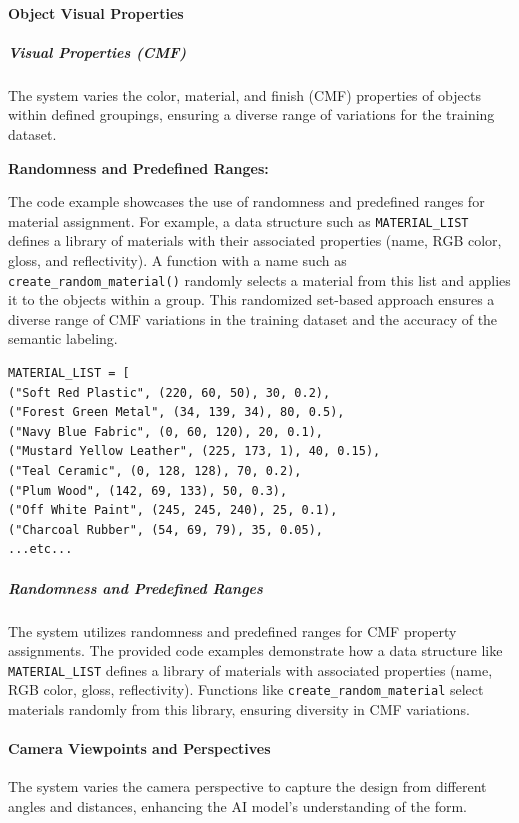 \documentclass[12pt]{article}
\begin{document}
\paragraph{Object Visual Properties}

\subparagraph{Visual Properties (CMF)}
The system varies the color, material, and finish (CMF) properties of objects within defined groupings, ensuring a diverse range of variations for the training dataset.

\textbf{Randomness and Predefined Ranges:}

The code example showcases the use of randomness and predefined ranges for material assignment. For example, a data structure such as \texttt{MATERIAL\_LIST} defines a library of materials with their associated properties (name, RGB color, gloss, and reflectivity). A function with a name such as \texttt{create\_random\_material()} randomly selects a material from this list and applies it to the objects within a group. This randomized set-based approach ensures a diverse range of CMF variations in the training dataset and the accuracy of the semantic labeling.

\begin{verbatim}
MATERIAL_LIST = [
("Soft Red Plastic", (220, 60, 50), 30, 0.2),
("Forest Green Metal", (34, 139, 34), 80, 0.5),
("Navy Blue Fabric", (0, 60, 120), 20, 0.1),
("Mustard Yellow Leather", (225, 173, 1), 40, 0.15),
("Teal Ceramic", (0, 128, 128), 70, 0.2),
("Plum Wood", (142, 69, 133), 50, 0.3),
("Off White Paint", (245, 245, 240), 25, 0.1),
("Charcoal Rubber", (54, 69, 79), 35, 0.05),
...etc...
\end{verbatim}

\subparagraph{Randomness and Predefined Ranges}
The system utilizes randomness and predefined ranges for CMF property assignments. The provided code examples demonstrate how a data structure like \texttt{MATERIAL\_LIST} defines a library of materials with associated properties (name, RGB color, gloss, reflectivity). Functions like \texttt{create\_random\_material} select materials randomly from this library, ensuring diversity in CMF variations.

\paragraph{Camera Viewpoints and Perspectives}
The system varies the camera perspective to capture the design from different angles and distances, enhancing the AI model's understanding of the form.
\end{document}
